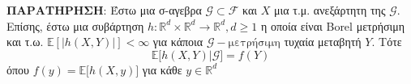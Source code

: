 \documentclass[12pt,a4paper]{article}
\theoremstyle{definition}
\numberwithin{equation}{section}
\begin{document}
\textbf{ΠΑΡΑΤΗΡΗΣΗ}: Έστω μια σ-αγεβρα \(\mathcal{G}\subset \mathcal{F}\) και \(X\) μια τ.μ. ανεξάρτητη της \(\mathcal{G}\). Επίσης, έστω μια συβάρτηση \(h: \mathbb{R}^d \times \mathbb{R}^d \rightarrow \mathbb{R}^d, d \geq 1\) η οποία είναι
\textlatin{Borel} μετρήσιμη και τ.ω. \(\mathbb{E}[|h(X,Y)|] < \infty\) για κάποια \(\mathcal{G}-\text{μετρήσιμη}\) τυχαία μεταβητή \(Y\). Τότε
$$ \mathbb{E}\big[ h(X,Y) | \mathcal{G} \big]  = f(Y)$$
όπου \(f(y) = \mathbb{E}\big[h(X,y)\big]\) για κάθε \(y \in \mathbb{R}^d\)
\end{document}
